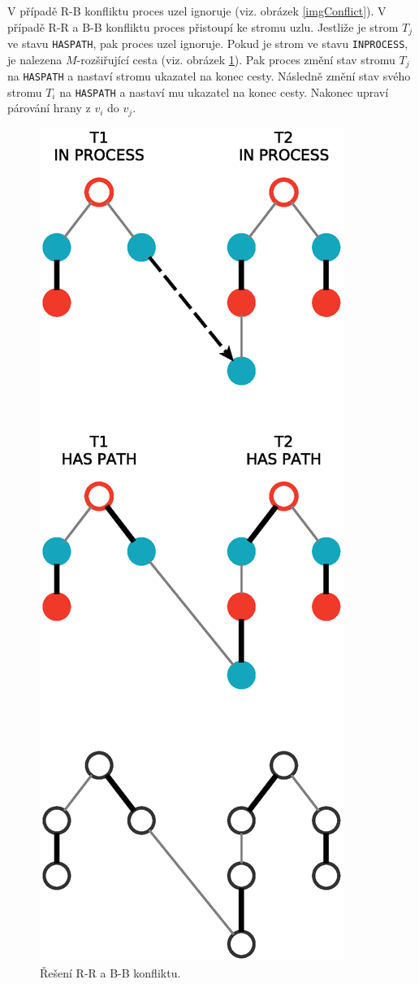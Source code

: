 \documentclass[a4paper, 11pt, titlepage, final]{article}[3. prosinec 2011]
\begin{document}
V případě R-B konfliktu proces uzel ignoruje (viz. obrázek \ref{imgConflict}). V případě R-R a B-B konfliktu proces přistoupí ke stromu uzlu. Jestliže je strom $T_j$ ve stavu \texttt{HASPATH}, pak proces uzel ignoruje. Pokud je strom ve stavu \texttt{INPROCESS}, je nalezena $M$-rozšiřující cesta (viz. obrázek \ref{imgHasPath}). Pak proces změní stav stromu $T_j$ na \texttt{HASPATH} a nastaví stromu ukazatel na konec cesty. Následně změní stav svého stromu $T_i$ na \texttt{HASPATH} a nastaví mu ukazatel na konec cesty. Nakonec upraví párování hrany z $v_i$ do $v_j$.

\begin{figure}[ht]
  \centering
  \includegraphics[scale=0.5]{img/haspath.eps}
  \caption{Řešení R-R a B-B konfliktu.}
  \label{imgHasPath}
\end{figure}
\end{document}
